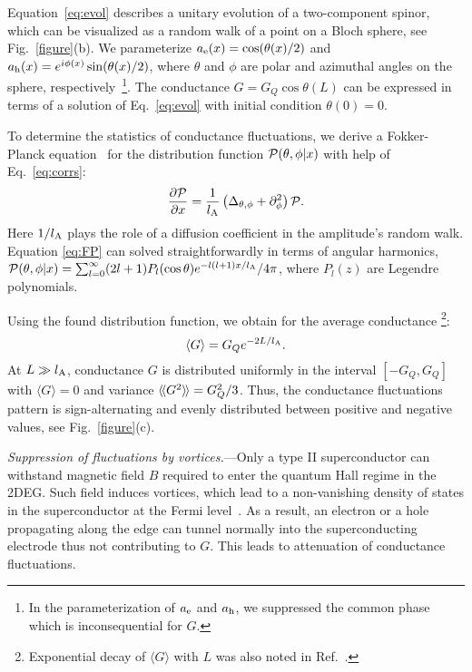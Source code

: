 \documentclass[reprint,
superscriptaddress,
amsmath,
amssymb,
aps,
prl,
floatfix,
english
]{revtex4-2}
\newcommand{\lprox}{L}
\newcommand{\lA}{l_{\rm A}}
\newcommand{\rngl}{\rangle\hspace{-0.05cm}\rangle}
\newcommand{\lngl}{\langle\hspace{-0.05cm}\langle}
\begin{document}
Equation~\eqref{eq:evol} describes a unitary evolution of a two-component spinor, which can be visualized as a random walk of a point on a Bloch sphere, see Fig.~\ref{figure}(b).
We parameterize $a_{\rm e}(x) = \cos (\theta(x) / 2)$ and $a_{\rm h}(x) = e^{i\phi(x)} \sin (\theta(x) / 2)$, where $\theta$ and $\phi$ are polar and azimuthal angles on the sphere, respectively~\footnote{In the parameterization of  $a_{\rm e}$ and $a_{\rm h}$, we suppressed the common phase which is inconsequential for $G$.}.
The conductance $G = G_Q \cos \theta(L)$ can be expressed in terms of a solution of Eq.~\eqref{eq:evol} with initial condition $\theta(0) = 0$.

To determine the statistics of conductance fluctuations, we derive a Fokker-Planck equation~\cite{vankampen2007} for the distribution function ${\cal P}(\theta, \phi|x)$ with help of Eq.~\eqref{eq:corrs}:
\begin{equation}\label{eq:FP}
    \frac{\partial {\cal P}}{\partial x} = \frac{1}{\lA}\left(\Delta_{\theta, \phi}  + \partial^2_\phi\right) {\cal P}.
\end{equation}
Here $1/\lA$ plays the role of a diffusion coefficient in the amplitude's random walk.
Equation \eqref{eq:FP} can solved straightforwardly in terms of angular harmonics,
${\cal P}(\theta,\phi|x) = \sum_{l=0}^{\infty}(2l+1) P_l(\cos \theta) e^{-l(l+1)x / \lA} / 4\pi$, where $P_l(z)$ are Legendre polynomials.

Using the found distribution function, we obtain for the average conductance \footnote{Exponential decay of $\langle G \rangle$ with $L$ was also noted in Ref.~\cite{zhang2020}.}:
\begin{equation}\label{eq:mean}
    \langle G \rangle =  G_Q e^{-2\lprox / \lA}.
\end{equation}
At $\lprox \gg \lA$, conductance $G$ is distributed uniformly in the interval $[-G_Q, G_Q]$ with $\langle G \rangle = 0$ and variance $\lngl G^2 \rngl = G^2_Q / 3$. Thus, the conductance fluctuations pattern is sign-alternating and evenly distributed between positive and negative values, see Fig.~\ref{figure}(c).

\textit{Suppression of fluctuations by vortices.}---Only a type II superconductor can withstand magnetic field $B$ required to enter the quantum Hall regime in the 2DEG.
Such field
induces vortices, which lead to a non-vanishing density of states in the superconductor at the Fermi level~\cite{wattstobin1973}.
As a result, an electron or a hole propagating along the edge can tunnel normally into the superconducting electrode thus not contributing to $G$.
This leads to attenuation of conductance fluctuations.
\end{document}

